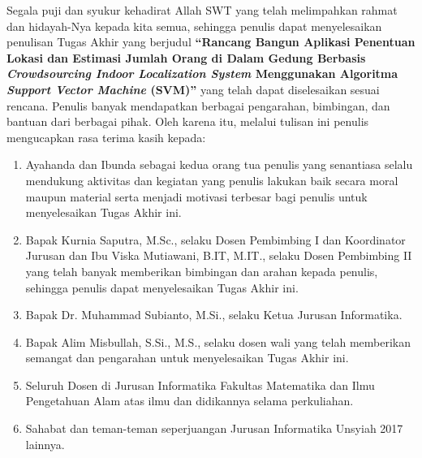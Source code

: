 \preface %


Segala puji dan syukur kehadirat Allah SWT yang telah melimpahkan rahmat dan hidayah-Nya kepada kita semua, sehingga penulis dapat menyelesaikan penulisan Tugas Akhir yang berjudul \textbf{“Rancang Bangun Aplikasi Penentuan Lokasi dan Estimasi Jumlah Orang di Dalam Gedung Berbasis \textit{Crowdsourcing Indoor Localization System} Menggunakan Algoritma \textit{Support Vector Machine} (SVM)”} yang telah dapat diselesaikan sesuai rencana. Penulis banyak mendapatkan berbagai pengarahan, bimbingan, dan bantuan dari berbagai pihak. Oleh karena itu, melalui tulisan ini penulis mengucapkan rasa terima kasih kepada:

\begin{enumerate}
	\item{Ayahanda dan Ibunda sebagai kedua orang tua penulis yang senantiasa selalu mendukung aktivitas dan kegiatan yang penulis lakukan baik secara moral maupun material serta menjadi motivasi terbesar bagi penulis untuk menyelesaikan Tugas Akhir ini.}
	\item{Bapak Kurnia Saputra, M.Sc., selaku Dosen Pembimbing I dan Koordinator Jurusan dan Ibu Viska Mutiawani, B.IT, M.IT., selaku Dosen Pembimbing II yang telah banyak memberikan bimbingan dan arahan kepada penulis, sehingga penulis dapat menyelesaikan Tugas Akhir ini.}
	\item {Bapak Dr. Muhammad Subianto, M.Si., selaku Ketua Jurusan Informatika.}
	      \item{Bapak Alim Misbullah, S.Si., M.S., selaku dosen wali yang telah memberikan semangat dan pengarahan untuk menyelesaikan Tugas Akhir ini.}
	      \item{Seluruh Dosen di Jurusan Informatika Fakultas Matematika dan Ilmu Pengetahuan Alam atas ilmu dan didikannya selama perkuliahan.}
	      \item{Sahabat dan teman-teman seperjuangan Jurusan Informatika Unsyiah 2017 lainnya.}
\end{enumerate}

